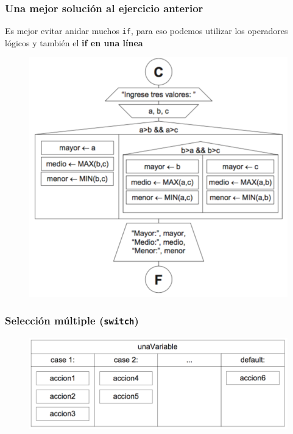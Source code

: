 \documentclass[handout]{beamer}
\begin{document}
\begin{frame}[t]\frametitle{Una mejor solución al ejercicio anterior}
    Es mejor evitar anidar muchos \texttt{if}, para eso podemos utilizar los operadores lógicos y también el \textbf{if en una línea}
\begin{figure}[tb]
  \centering
  \includegraphics[scale=.6]{./img/ifani2}
\end{figure}

\end{frame}

\begin{frame}[t]\frametitle{Selección múltiple (\texttt{switch})}
    
\begin{figure}[tb]
    \centering
    \includegraphics[scale=.7]{./img/explicacionswitch}
\end{figure}

\end{frame}
\end{document}
